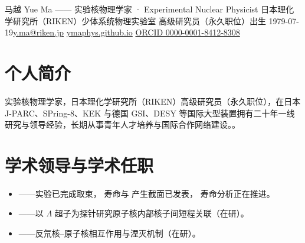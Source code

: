 \documentclass[a4paper,11pt,fontset=none]{ctexart}
\begin{document}
  {马越 Yue Ma —— 实验核物理学家 · Experimental Nuclear Physicist}
  {日本理化学研究所（RIKEN）少体系统物理实验室 高级研究员（永久职位）\quad\textbar\quad 出生 1979-07-19\quad\textbar\quad \href{mailto:y.ma@riken.jp}{y.ma@riken.jp} \quad\textbar\quad \href{https://ymaphys.github.io}{ymaphys.github.io} \quad\textbar\quad \href{https://orcid.org/0000-0001-8412-8308}{ORCID 0000-0001-8412-8308}}

\section{个人简介}

实验核物理学家，日本理化学研究所（RIKEN）高级研究员（永久职位），在日本 J-PARC、SPring-8、KEK 与德国 GSI、DESY 等国际大型装置拥有二十年一线研究与领导经验，长期从事青年人才培养与国际合作网络建设。。

\section{学术领导与学术任职}
\begin{itemize}
  \item {}——实验已完成取束， 寿命与  产生截面已发表， 寿命分析正在推进。
  \item {}——以 $\Lambda$ 超子为探针研究原子核内部核子间短程关联（在研）。
  \item {}——反氘核--原子核相互作用与湮灭机制（在研）。
\end{itemize}
\end{document}
